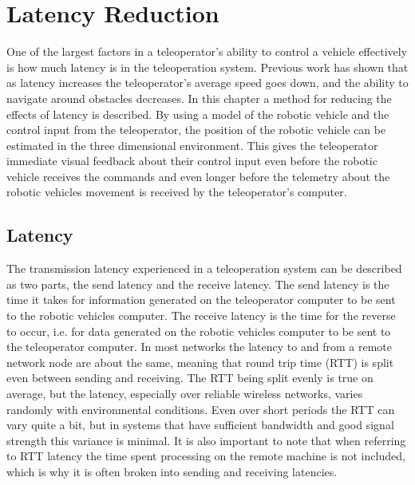 \documentclass[12pt]{report}
\begin{document}
\chapter{Latency Reduction}\label{chap:latency_reduction}
One of the largest factors in a teleoperator's ability to control a vehicle effectively is how much latency is in the teleoperation system.  Previous work has shown that as latency increases the teleoperator's average speed goes down, and the ability to navigate around obstacles decreases\cite{photo_real}\cite{kaber2000effects}.  In this chapter a method for reducing the effects of latency is described.  By using a model of the robotic vehicle and the control input from the teleoperator, the position of the robotic vehicle can be estimated in the three dimensional environment.  This gives the teleoperator immediate visual feedback about their control input even before the robotic vehicle receives the commands and even longer before the telemetry about the robotic vehicles movement is received by the teleoperator's computer.

\section{Latency}
The transmission latency experienced in a teleoperation system can be described as two parts, the send latency and the receive latency.  The send latency is the time it takes for information generated on the teleoperator computer to be sent to the robotic vehicles computer.  The receive latency is the time for the reverse to occur, i.e. for data generated on the robotic vehicles computer to be sent to the teleoperator computer.  In most networks the latency to and from a remote network node are about the same, meaning that round trip time (RTT) is split even between sending and receiving.  The RTT being split evenly is true on average, but the latency, especially over reliable wireless networks, varies randomly with environmental conditions.  Even over short periods the RTT can vary quite a bit, but in systems that have sufficient bandwidth and good signal strength this variance is minimal.  It is also important to note that when referring to RTT latency the time spent processing on the remote machine is not included, which is why it is often broken into sending and receiving latencies.
\end{document}

